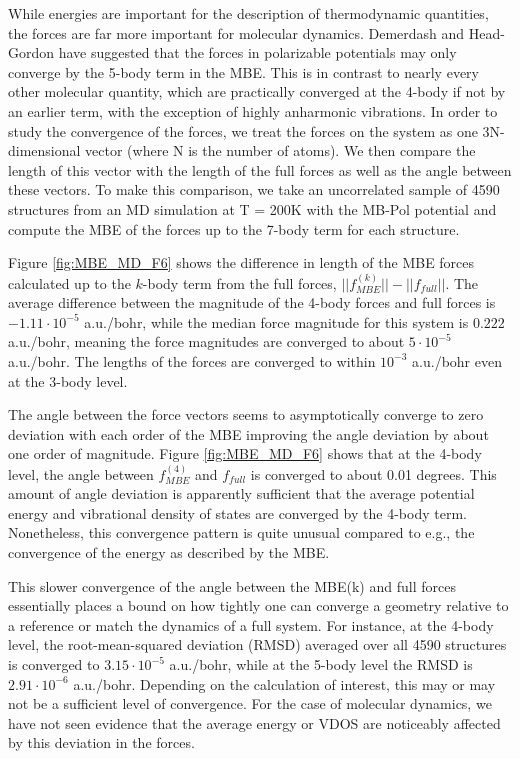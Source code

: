 \documentclass[11pt, proquest]{uwthesis}[2020/02/24]
\let\ce\ch
\begin{document}
\par While energies are important for the description of thermodynamic quantities, the forces are far more important for molecular dynamics. Demerdash and Head-Gordon have suggested that the forces in polarizable potentials may only converge by the 5-body term in the MBE.\autocite{demerdash_assessing_2017} This is in contrast to nearly every other molecular quantity, which are practically converged at the 4-body if not by an earlier term,\autocite{bates_development_2011,medders_many-body_2013,xantheas_cooperativity_2000} with the exception of highly anharmonic vibrations.\autocite{heindel_origin_2018} In order to study the convergence of the forces, we treat the forces on the system as one 3N-dimensional vector (where N is the number of atoms). We then compare the length of this vector with the length of the full forces as well as the angle between these vectors. To make this comparison, we take an uncorrelated sample of 4590 structures from an MD simulation at T = 200K with the MB-Pol potential and compute the MBE of the forces up to the 7-body term for each structure.



\par Figure \ref{fig:MBE_MD_F6} shows the difference in length of the MBE forces calculated up to the $k$-body term from the full forces, $||f^{(k)}_{MBE}||-||f_{full}||$. The average difference between the magnitude of the 4-body forces and full forces is $-1.11\cdot 10^{-5}$ a.u./bohr, while the median force magnitude for this system is $0.222$ a.u./bohr, meaning the force magnitudes are converged to about $5\cdot 10^{-5}$ a.u./bohr. The lengths of the forces are converged to within $10^{-3}$ a.u./bohr even at the 3-body level.

\par The angle between the force vectors seems to asymptotically converge to zero deviation with each order of the MBE improving the angle deviation by about one order of magnitude. Figure \ref{fig:MBE_MD_F6} shows that at the 4-body level, the angle between $f^{(4)}_{MBE}$ and $f_{full}$ is converged to about 0.01 degrees. This amount of angle deviation is apparently sufficient that the average potential energy and vibrational density of states are converged by the 4-body term. Nonetheless, this convergence pattern is quite unusual compared to e.g., the convergence of the energy as described by the MBE.

\par This slower convergence of the angle between the MBE(k) and full forces essentially places a bound on how tightly one can converge a geometry relative to a reference or match the dynamics of a full system. For instance, at the 4-body level, the root-mean-squared deviation (RMSD) averaged over all 4590 \ce{(H2O)_{10}} structures is converged to $3.15\cdot 10^{-5}$ a.u./bohr, while at the 5-body level the RMSD is $2.91\cdot 10^{-6}$ a.u./bohr. Depending on the calculation of interest, this may or may not be a sufficient level of convergence. For the case of molecular dynamics, we have not seen evidence that the average energy or VDOS are noticeably affected by this deviation in the forces.
\end{document}
